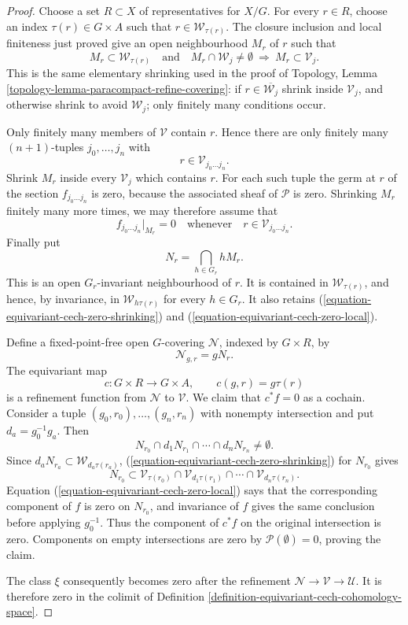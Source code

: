 \begin{proof}
Choose a set $R\subset X$ of representatives for $X/G$. For every
$r\in R$, choose an index $\tau(r)\in G\times A$ such that
$r\in\mathcal W_{\tau(r)}$. The closure inclusion and local finiteness just
proved give an open neighbourhood $M_r$ of $r$ such that
\begin{equation}
\label{equation-equivariant-cech-zero-shrinking}
M_r\subset\mathcal W_{\tau(r)}
\quad\text{and}\quad
M_r\cap\mathcal W_j\neq\emptyset
\ \Longrightarrow\ M_r\subset\mathcal V_j.
\end{equation}
This is the same elementary shrinking used in the proof of Topology,
Lemma \ref{topology-lemma-paracompact-refine-covering}: if
$r\in\overline{\mathcal W_j}$ shrink inside $\mathcal V_j$, and otherwise
shrink to avoid $\mathcal W_j$; only finitely many conditions occur.

Only finitely many members of $\mathcal V$ contain $r$. Hence there are
only finitely many $(n+1)$-tuples $j_0,\ldots,j_n$ with
$$
r\in\mathcal V_{j_0\ldots j_n}.
$$
Shrink $M_r$ inside every $\mathcal V_j$ which contains $r$.
For each such tuple the germ at $r$ of the section $f_{j_0\ldots j_n}$
is zero, because the associated sheaf of $\mathcal P$ is zero. Shrinking
$M_r$ finitely many more times, we may therefore assume that
\begin{equation}
\label{equation-equivariant-cech-zero-local}
f_{j_0\ldots j_n}|_{M_r}=0
\quad\text{whenever}\quad
r\in\mathcal V_{j_0\ldots j_n}.
\end{equation}
Finally put
$$
N_r=\bigcap_{h\in G_r}hM_r.
$$
This is an open $G_r$-invariant neighbourhood of $r$. It is contained in
$\mathcal W_{\tau(r)}$, and hence, by invariance, in
$\mathcal W_{h\tau(r)}$ for every $h\in G_r$. It also retains
(\ref{equation-equivariant-cech-zero-shrinking}) and
(\ref{equation-equivariant-cech-zero-local}).

Define a fixed-point-free open $G$-covering $\mathcal N$, indexed by
$G\times R$, by
$$
\mathcal N_{g,r}=gN_r.
$$
The equivariant map
$$
c:G\times R\longrightarrow G\times A,
\qquad c(g,r)=g\tau(r)
$$
is a refinement function from $\mathcal N$ to $\mathcal V$.
We claim that $c^*f=0$ as a cochain. Consider a tuple
$(g_0,r_0),\ldots,(g_n,r_n)$ with nonempty intersection and put
$d_a=g_0^{-1}g_a$. Then
$$
N_{r_0}\cap d_1N_{r_1}\cap\cdots\cap d_nN_{r_n}\neq\emptyset.
$$
Since
$d_aN_{r_a}\subset\mathcal W_{d_a\tau(r_a)}$,
(\ref{equation-equivariant-cech-zero-shrinking}) for $N_{r_0}$ gives
$$
N_{r_0}\subset
\mathcal V_{\tau(r_0)}\cap
\mathcal V_{d_1\tau(r_1)}\cap\cdots\cap
\mathcal V_{d_n\tau(r_n)}.
$$
Equation (\ref{equation-equivariant-cech-zero-local}) says that the
corresponding component of $f$ is zero on $N_{r_0}$, and invariance of
$f$ gives the same conclusion before applying $g_0^{-1}$. Thus the
component of $c^*f$ on the original intersection is zero. Components on
empty intersections are zero by $\mathcal P(\emptyset)=0$, proving the
claim.

The class $\xi$ consequently becomes zero after the refinement
$\mathcal N\to\mathcal V\to\mathcal U$. It is therefore zero in the
colimit of Definition
\ref{definition-equivariant-cech-cohomology-space}.
\end{proof}

